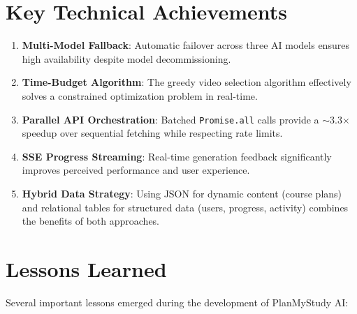 \documentclass[12pt,a4paper]{report}
\begin{document}
\section{Key Technical Achievements}
\begin{enumerate}[noitemsep]
    \item \textbf{Multi-Model Fallback}: Automatic failover across three AI models ensures high availability despite model decommissioning.
    \item \textbf{Time-Budget Algorithm}: The greedy video selection algorithm effectively solves a constrained optimization problem in real-time.
    \item \textbf{Parallel API Orchestration}: Batched \texttt{Promise.all} calls provide a $\sim$3.3$\times$ speedup over sequential fetching while respecting rate limits.
    \item \textbf{SSE Progress Streaming}: Real-time generation feedback significantly improves perceived performance and user experience.
    \item \textbf{Hybrid Data Strategy}: Using JSON for dynamic content (course plans) and relational tables for structured data (users, progress, activity) combines the benefits of both approaches.
\end{enumerate}

\section{Lessons Learned}
Several important lessons emerged during the development of PlanMyStudy AI:
\end{document}

